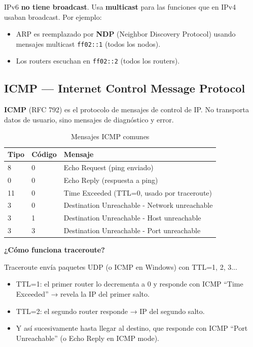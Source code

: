 \begin{cuidado}
IPv6 \textbf{no tiene broadcast}. Usa \textbf{multicast} para las funciones
que en IPv4 usaban broadcast. Por ejemplo:
\begin{itemize}
    \item ARP es reemplazado por \textbf{NDP} (Neighbor Discovery Protocol)
          usando mensajes multicast \texttt{ff02::1} (todos los nodos).
    \item Los routers escuchan en \texttt{ff02::2} (todos los routers).
\end{itemize}
\end{cuidado}

\subsection{ICMP --- Internet Control Message Protocol}

\begin{concepto}
\textbf{ICMP} (RFC 792) es el protocolo de mensajes de control de IP.
No transporta datos de usuario, sino mensajes de diagnóstico y error.
\end{concepto}

\begin{table}[h!]
\centering
\renewcommand{\arraystretch}{1.3}
\begin{tabular}{lll}
\toprule
\textbf{Tipo} & \textbf{Código} & \textbf{Mensaje} \\
\midrule
8  & 0 & Echo Request (ping enviado) \\
0  & 0 & Echo Reply (respuesta a ping) \\
11 & 0 & Time Exceeded (TTL=0, usado por traceroute) \\
3  & 0 & Destination Unreachable - Network unreachable \\
3  & 1 & Destination Unreachable - Host unreachable \\
3  & 3 & Destination Unreachable - Port unreachable \\
\bottomrule
\end{tabular}
\caption{Mensajes ICMP comunes}
\end{table}

\begin{ejemplo}
\textbf{¿Cómo funciona traceroute?}

Traceroute envía paquetes UDP (o ICMP en Windows) con TTL=1, 2, 3...
\begin{itemize}
    \item TTL=1: el primer router lo decrementa a 0 y responde con ICMP
          ``Time Exceeded'' → revela la IP del primer salto.
    \item TTL=2: el segundo router responde → IP del segundo salto.
    \item Y así sucesivamente hasta llegar al destino, que responde con
          ICMP ``Port Unreachable'' (o Echo Reply en ICMP mode).
\end{itemize}
\end{ejemplo}
